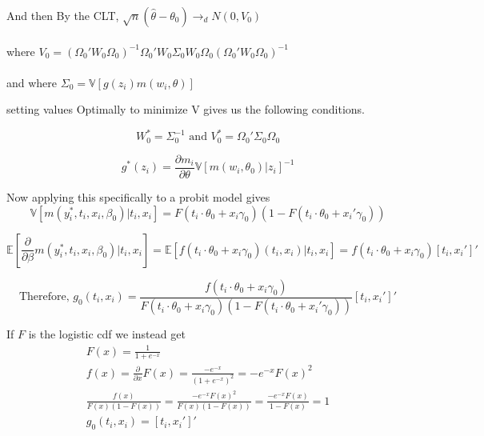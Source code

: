 \documentclass[11pt]{article}
\begin{document}
And then  By the CLT, $\sqrt n(\hat{\theta}-\theta_0) \rightarrow_d N(0,V_0)$ \\ \\
where $ V_0 = (\Omega_0'W_0\Omega_0)^{-1}\Omega_0'W_0\Sigma_0W_0\Omega_0(\Omega_0'W_0\Omega_0)^{-1}$\\ \\ 

and where $ \Sigma_0 = \mathbb{V}[g(z_i)m(w_i,\theta)]$


 setting values Optimally to minimize V gives us the following conditions. 
 
 $$ W_0^* = \Sigma_0^{-1} \text{ and } V_0^* = \Omega_0'\Sigma_0\Omega_0$$

$$g^*(z_i) = \frac{\partial m_i}{\partial \theta} \mathbb{V}[m(w_i,\theta_0)|z_i]^{-1} $$


Now applying this specifically to a probit model gives 
$$ \mathbb{V}[m(y_i^*,t_i,x_i,\beta_0)|t_i,x_i]=F(t_i \cdot \theta_0+x_i\gamma_0)(1-F(t_i \cdot \theta_0 + x_i'\gamma_0))$$

$$\mathbb{E}[\frac{\partial}{\partial \beta}m(y_i^*,t_i,x_i,\beta_0)|t_i,x_i] = \mathbb{E}[f(t_i \cdot \theta_0+x_i\gamma_0)(t_i,x_i)|t_i,x_i]
= f(t_i \cdot \theta_0+x_i\gamma_0)[t_i,x_i']'$$

$$\text{Therefore, } g_0(t_i,x_i) = \frac{f(t_i \cdot \theta_0+x_i\gamma_0)}{F(t_i \cdot \theta_0+x_i\gamma_0)(1-F(t_i \cdot \theta_0 + x_i'\gamma_0))}[t_i,x_i']'$$


If $F$ is the logistic cdf we instead get 
\begin{align*}
F(x) = \frac{1}{1+e^{-x}}\\
f(x) = \frac{\partial}{\partial x}F(x) = \frac{-e^{-x}}{(1+e^{-x})^2} =-e^{-x}F(x)^2\\
\frac{f(x)}{F(x)(1-F(x))} = \frac{-e^{-x}F(x)^2}{F(x)(1-F(x))} = \frac{-e^{-x}F(x)}{1-F(x)} = 1 \\
g_0(t_i,x_i) = [t_i,x_i']'
\end{align*}
\end{document}
